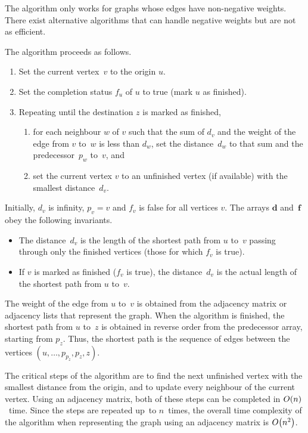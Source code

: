 The algorithm only works for graphs whose edges have non-negative weights.
There exist alternative algorithms that can handle negative weights but are not as efficient.

The algorithm proceeds as follows.
\begin{enumerate}
  \item Set the current vertex~\( v \) to the origin \( u \).
  \item Set the completion status \( f_{u} \) of \( u \) to true (mark \( u \) as finished).
  \item Repeating until the destination \( z \) is marked as finished,
  \begin{enumerate}
    \item for each neighbour \( w \) of \( v \) such that the sum of \( d_{v} \) and the weight of the edge from \( v \) to~\( w \) is less than \( d_{w} \), set the distance~\( d_{w} \) to that sum and the predecessor~\( p_{w} \) to~\( v \), and
    \item set the current vertex \( v \) to an unfinished vertex (if available) with the smallest distance~\( d_{v} \).
  \end{enumerate}
\end{enumerate}

Initially, \( d_{v} \) is infinity, \( p_{v} = v \) and \( f_{v} \) is false for all vertices \( v \).
The arrays \( \boldsymbol{d} \) and~\( \boldsymbol{f} \) obey the following invariants.
\begin{itemize}
  \item The distance~\( d_{v} \) is the length of the shortest path from \( u \) to~\( v \) passing through only the finished vertices (those for which \( f_{v} \) is true).
  \item If \( v \) is marked as finished (\( f_{v} \) is true), the distance~\( d_{v} \) is the actual length of the shortest path from \( u \) to~\( v \).
\end{itemize}
The weight of the edge from \( u \) to~\( v \) is obtained from the adjacency matrix or adjacency lists that represent the graph.
When the algorithm is finished, the shortest path from \( u \) to~\( z \) is obtained in reverse order from the predecessor array, starting from \( p_{z} \).
Thus, the shortest path is the sequence of edges between the vertices \( \left( u, \ldots, p_{p_{z}}, p_{z}, z \right) \).

The critical steps of the algorithm are to find the next unfinished vertex with the smallest distance from the origin, and to update every neighbour of the current vertex.
Using an adjacency matrix, both of these steps can be completed in \( O\!\left(n\right) \)~time.
Since the steps are repeated up~to \( n \)~times, the overall time complexity of the algorithm when representing the graph using an adjacency matrix is \( O\!\left(n^{2}\right) \).

